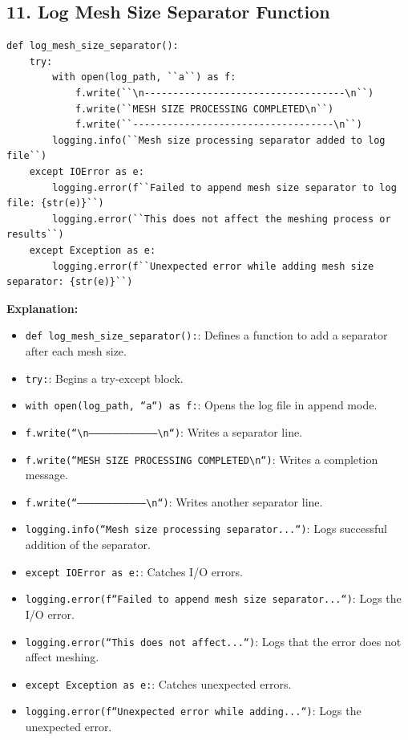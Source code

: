 \documentclass{book}
\begin{document}
\begin{itemize}[leftmargin=*,label=\textbullet]
\subsection*{11. Log Mesh Size Separator Function}
\begin{lstlisting}[caption={Log Mesh Size Separator Function},label={lst:log_separator}]
def log_mesh_size_separator():
    try:
        with open(log_path, ``a``) as f:
            f.write(``\n-----------------------------------\n``)
            f.write(``MESH SIZE PROCESSING COMPLETED\n``)
            f.write(``-----------------------------------\n``)
        logging.info(``Mesh size processing separator added to log file``)
    except IOError as e:
        logging.error(f``Failed to append mesh size separator to log file: {str(e)}``)
        logging.error(``This does not affect the meshing process or results``)
    except Exception as e:
        logging.error(f``Unexpected error while adding mesh size separator: {str(e)}``)
\end{lstlisting}
\textbf{Explanation:}
\begin{itemize}
    \item \texttt{def log\_mesh\_size\_separator():}: Defines a function to add a separator after each mesh size.
    \item \texttt{try:}: Begins a try-except block.
    \item \texttt{with open(log\_path, ``a``) as f:}: Opens the log file in append mode.
    \item \texttt{f.write(``\textbackslash n-----------------------------------\textbackslash n``)}: Writes a separator line.
    \item \texttt{f.write(``MESH SIZE PROCESSING COMPLETED\textbackslash n``)}: Writes a completion message.
    \item \texttt{f.write(``-----------------------------------\textbackslash n``)}: Writes another separator line.
    \item \texttt{logging.info(``Mesh size processing separator...``)}: Logs successful addition of the separator.
    \item \texttt{except IOError as e:}: Catches I/O errors.
    \item \texttt{logging.error(f``Failed to append mesh size separator...``)}: Logs the I/O error.
    \item \texttt{logging.error(``This does not affect...``)}: Logs that the error does not affect meshing.
    \item \texttt{except Exception as e:}: Catches unexpected errors.
    \item \texttt{logging.error(f``Unexpected error while adding...``)}: Logs the unexpected error.
\end{itemize}


\end{itemize}
\end{document}

